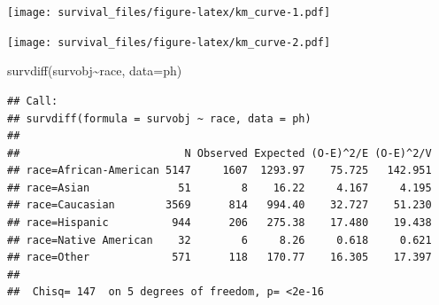 \documentclass[
]{article}
\newenvironment{Shaded}{\begin{snugshade}}{\end{snugshade}}
\newcommand{\AttributeTok}[1]{\textcolor[rgb]{0.77,0.63,0.00}{#1}}
\newcommand{\DecValTok}[1]{\textcolor[rgb]{0.00,0.00,0.81}{#1}}
\newcommand{\FunctionTok}[1]{\textcolor[rgb]{0.00,0.00,0.00}{#1}}
\newcommand{\NormalTok}[1]{#1}
\newcommand{\OtherTok}[1]{\textcolor[rgb]{0.56,0.35,0.01}{#1}}
\newcommand{\SpecialCharTok}[1]{\textcolor[rgb]{0.00,0.00,0.00}{#1}}
\newcommand{\StringTok}[1]{\textcolor[rgb]{0.31,0.60,0.02}{#1}}
\begin{document}
\texttt{[image: survival\_files/figure-latex/km\_curve-1.pdf]}

\begin{Shaded}
\end{Shaded}

\texttt{[image: survival\_files/figure-latex/km\_curve-2.pdf]}

\begin{Shaded}
\begin{Highlighting}[]
\FunctionTok{survdiff}\NormalTok{(survobj}\SpecialCharTok{\textasciitilde{}}\NormalTok{race, }\AttributeTok{data=}\NormalTok{ph)}
\end{Highlighting}
\end{Shaded}

\begin{verbatim}
## Call:
## survdiff(formula = survobj ~ race, data = ph)
## 
##                          N Observed Expected (O-E)^2/E (O-E)^2/V
## race=African-American 5147     1607  1293.97    75.725   142.951
## race=Asian              51        8    16.22     4.167     4.195
## race=Caucasian        3569      814   994.40    32.727    51.230
## race=Hispanic          944      206   275.38    17.480    19.438
## race=Native American    32        6     8.26     0.618     0.621
## race=Other             571      118   170.77    16.305    17.397
## 
##  Chisq= 147  on 5 degrees of freedom, p= <2e-16
\end{verbatim}
\end{document}
